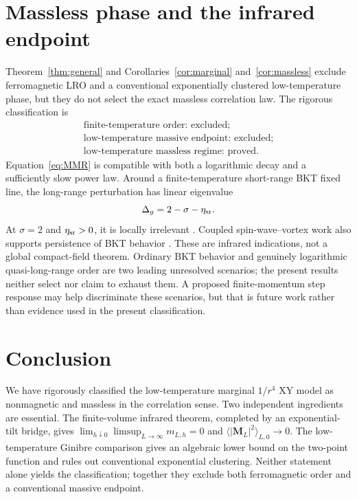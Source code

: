 \documentclass[aps,prb,twocolumn,groupedaddress,amsmath,amssymb,
               superscriptaddress,nofootinbib,floatfix]{revtex4-2}
\theoremstyle{plain}
\theoremstyle{definition}
\begin{document}
\section{Massless phase and the infrared endpoint}

Theorem~\ref{thm:general} and Corollaries~\ref{cor:marginal}
and~\ref{cor:massless} exclude ferromagnetic LRO and a conventional
exponentially clustered low-temperature phase, but they do not select the
exact massless correlation law.
The rigorous classification is
\begin{equation}
 \boxed{\begin{gathered}
 \text{finite-temperature order: excluded;}\\
 \text{low-temperature massive endpoint: excluded;}\\
 \text{low-temperature massless regime: proved.}
 \end{gathered}}
\label{eq:phase-classification}
\end{equation}
Equation~\eqref{eq:MMR} is compatible with both a logarithmic decay and a
sufficiently slow power law.  Around a finite-temperature short-range BKT
fixed line, the long-range perturbation has linear eigenvalue
\begin{equation}
 \Delta_g=2-\sigma-\eta_{\rm sr}.
\end{equation}
At $\sigma=2$ and $\eta_{\rm sr}>0$, it is locally irrelevant
\cite{Giachetti2021}.  Coupled spin-wave--vortex work also supports
persistence of BKT behavior \cite{Walther2026}.  These are infrared
indications, not a global compact-field theorem.  Ordinary BKT behavior and
genuinely logarithmic quasi-long-range order are two leading unresolved
scenarios; the present results neither select nor claim to exhaust them.  A
proposed finite-momentum step response may help discriminate these scenarios,
but that is future work rather than evidence used in the present
classification.

\section{Conclusion}

We have rigorously classified the low-temperature marginal $1/r^4$ XY model
as nonmagnetic and massless in the correlation sense.  Two independent
ingredients are essential.  The finite-volume infrared theorem, completed by
an exponential-tilt bridge, gives
$\lim_{h\downarrow0}\limsup_{L\to\infty}m_{L,h}=0$ and
$\langle|\bm M_L|^2\rangle_{L,0}\to0$.  The low-temperature Ginibre
comparison gives an algebraic lower bound on the two-point function and rules
out conventional exponential clustering.  Neither statement alone yields
the classification; together they exclude both ferromagnetic order and a
conventional massive endpoint.
\end{document}

